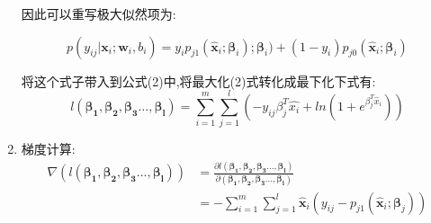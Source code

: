 \documentclass[11pt, a4paper, UTF8]{ctexart}
\begin{document}
\begin{solution}
\begin{enumerate}
因此可以重写极大似然项为:


$$p(y_{ij}|\bm{x}_i;\bm{w}_i,b_i)=y_ip_{j1}(\hat{\bm{x}}_i;\bm{\beta}_i);\bm{\beta}_i )+(1-y_i)p_{j0}(\hat{\bm{x}}_i;\bm{\beta}_i)$$

将这个式子带入到公式(2)中,将最大化(2)式转化成最下化下式有:
$$l(\bm{\beta_{1}},\bm{\beta_{2}},\bm{\beta_{3}}...,\bm{\beta_{l}})=\sum_{i=1}^{m} \sum _{j=1}^{l}(-y_{ij}\beta^{T}_j\hat{x_{i}}+ln(1+e^{\beta_{j}^{T}\hat{x}_i}))$$
  	\item 梯度计算:
  \begin{equation*}
  \begin{aligned}
  \nabla(l(\bm{\beta_{1}},\bm{\beta_{2}},\bm{\beta_{3}}...,\bm{\beta_{l}}))&=\frac{\partial l(\bm{\beta_{1}},\bm{\beta_{2}},\bm{\beta_{3}}...,\bm{\beta_{l}} )}{\partial(\bm{\beta_{1}},\bm{\beta_{2}},\bm{\beta_{3}}...,\bm{\beta_{l}})}\\&=-\sum_{i=1}^{m} \sum _{j=1}^{l}\hat{\bm{x}}_i(y_{ij}-p_{j1}(\hat{\bm{x}}_i;\bm{\beta} _{j}))
  \end{aligned}
  \end{equation*}
  	
  \end{enumerate}
    
\end{solution}
\end{document}
